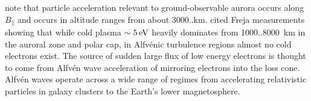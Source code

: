 \citet{chaston2007how,mcfadden1999} note that particle acceleration relevant to ground-observable aurora occurs along $B_\parallel$ and occurs in altitude ranges from about 3000..\unit[20000]{km}.
\citet{stasiewicz2000} cited Freja measurements showing that while cold plasma $\sim \unit[5]{eV}$ heavily dominates from 1000..8000~km in the auroral zone and polar cap, in Alfvénic turbulence regions almost no cold electrons exist.
The source of sudden large flux of low energy electrons is thought to come from Alfvén wave acceleration of mirroring electrons into the loss cone.
Alfvén waves operate across a wide range of regimes from accelerating relativistic particles in galaxy clusters \citep{brunetti2004} to the Earth's lower magnetosphere.


